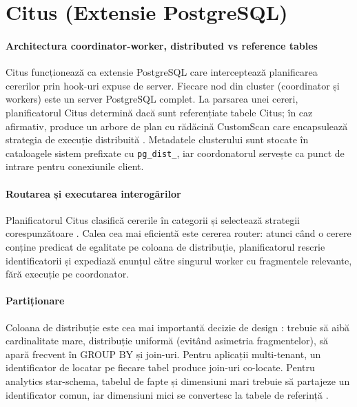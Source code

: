 \section{Citus (Extensie PostgreSQL)}

\paragraph{Architectura coordinator-worker, distributed vs reference tables}

Citus funcționează ca extensie PostgreSQL care interceptează planificarea cererilor prin hook-uri expuse de server. Fiecare nod din cluster (coordinator și workers) este un server PostgreSQL complet. La parsarea unei cereri, planificatorul Citus determină dacă sunt referențiate tabele Citus; în caz afirmativ, produce un arbore de plan cu rădăcină CustomScan care encapsulează strategia de execuție distribuită \cite{cubukcucitus2021}. Metadatele clusterului sunt stocate în cataloagele sistem prefixate cu \texttt{pg\_dist\_}, iar coordonatorul servește ca punct de intrare pentru conexiunile client.

\paragraph{Routarea și executarea interogărilor}

Planificatorul Citus clasifică cererile în categorii și selectează strategii corespunzătoare \cite{cubukcucitus2021, citusdata2017howcitusworks}. Calea cea mai eficientă este cererea router: atunci când o cerere conține predicat de egalitate pe coloana de distribuție, planificatorul rescrie identificatorii și expediază enunțul către singurul worker cu fragmentele relevante, fără execuție pe coordonator.

\paragraph{Partiționare}

Coloana de distribuție este cea mai importantă decizie de design \cite{citusDocs2026choosingDistributionColumn}: trebuie să aibă cardinalitate mare, distribuție uniformă (evitând asimetria fragmentelor), să apară frecvent în GROUP BY și join-uri. Pentru aplicații multi-tenant, un identificator de locatar pe fiecare tabel produce join-uri co-locate. Pentru analytics star-schema, tabelul de fapte și dimensiuni mari trebuie să partajeze un identificator comun, iar dimensiuni mici se convertesc la tabele de referință \cite{citusDocs2026choosingDistributionColumn, citusdata2017howcitusworks}.

